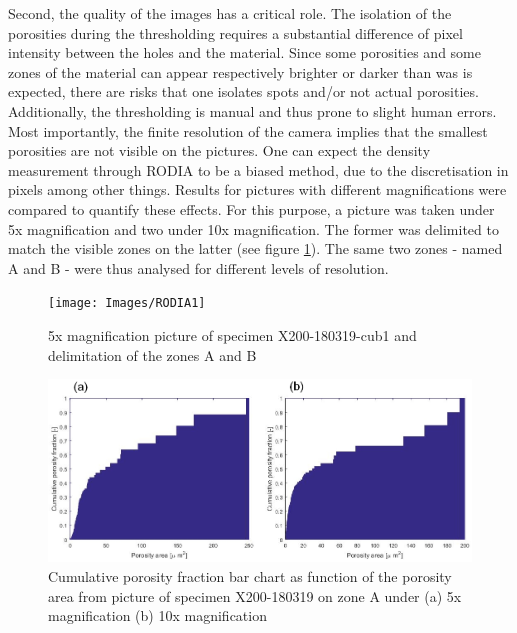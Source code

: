 Second, the quality of the images has a critical role. The isolation of the porosities during the thresholding requires a substantial difference of pixel intensity between the holes and the material. Since some porosities and some zones of the material can appear respectively brighter or darker than was is expected, there are risks that one isolates spots and/or not actual porosities. Additionally, the thresholding is manual and thus prone to slight human errors. \\

Most importantly, the finite resolution of the camera implies that the smallest porosities are not visible on the pictures. One can expect the density measurement through RODIA to be a biased method, due to the discretisation in pixels among other things. Results for pictures with different magnifications were compared to quantify these effects. For this purpose, a picture was taken under 5x magnification and two under 10x magnification. The former was delimited to match the visible zones on the latter (see figure \ref{fig:RODIA1}). The same two zones - named A and B - were thus analysed for different levels of resolution.\\

\begin{figure}[ht]
	\centering
	\centerline{\texttt{[image: Images/RODIA1]}}
	\decoRule
	\caption[5x magnification picture of specimen X200-180319-cub1 and delimitation of the zones A and B]{5x magnification picture of specimen X200-180319-cub1 and delimitation of the zones A and B}
	\label{fig:RODIA1}
\end{figure}

\begin{figure}[ht]
	\centering
	\centerline{\includegraphics[scale=0.7]{Images/CumSum}}
	\decoRule
	\caption[Cumulative porosity fraction bar chart as function of the porosity area from picture of specimen X200-180319 on zone A under (a) 5x magnification (b) 10x magnification]{Cumulative porosity fraction bar chart as function of the porosity area from picture of specimen X200-180319 on zone A under (a) 5x magnification (b) 10x magnification}
	\label{fig:CumSum}
\end{figure}



